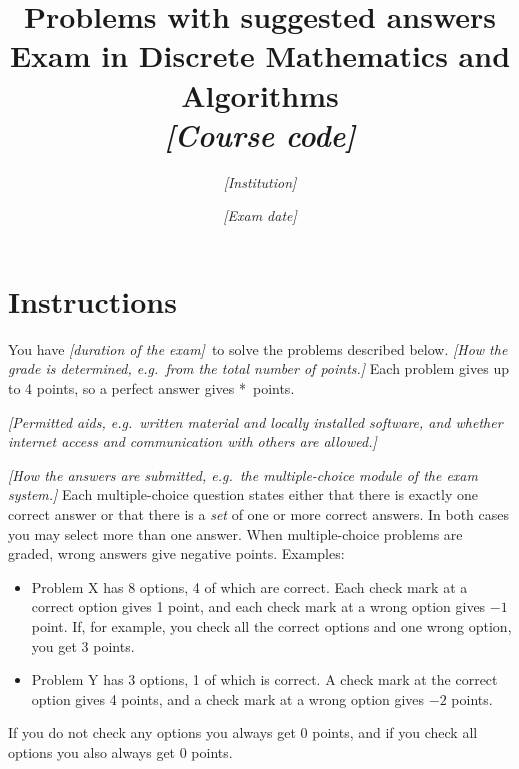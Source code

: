\documentclass[12pt]{article}
\newcommand{\placeholder}[1]{\textit{[#1]}}
\newcommand{\examdate}{\placeholder{Exam date}}
\newcommand{\examduration}{\placeholder{duration of the exam}}
\newcommand{\problemfile}{dma-problems-2026-april} %
\newcommand{\withanswers}{{\bf Problems with suggested answers}\\}
\newcommand{\withanswers}{}
\begin{document}
\title{\Large \withanswers Exam in Discrete Mathematics and Algorithms\\
{\small \placeholder{Course code}}}

\author{\placeholder{Institution}}
\date{\examdate}

\maketitle

\section*{Instructions}

You have \examduration\ to solve the  problems described below.
\placeholder{How the grade is determined, e.g.\ from the total number of points.}
Each problem gives up to 4 points, so a perfect answer gives \the{}*\relax\ points.

\medskip

\placeholder{Permitted aids, e.g.\ written material and locally installed software, and whether internet access and communication with others are allowed.}

\medskip

\placeholder{How the answers are submitted, e.g.\ the multiple-choice module of the exam system.}
Each multiple-choice question states either that there is exactly one correct answer or that there is a \emph{set} of one or more correct answers.
In both cases you may select more than one answer.
When multiple-choice problems are graded, wrong answers give negative points.
Examples:
\begin{itemize}
\item Problem X has 8 options, 4 of which are correct. Each check mark at a correct option gives 1 point, and each check mark at a wrong option gives $-1$ point. If, for example, you check all the correct options and one wrong option, you get 3 points.
\item Problem Y has 3 options, 1 of which is correct. A check mark at the correct option gives 4 points, and a check mark at a wrong option gives $-2$ points.
\end{itemize}
If you do not check any options you always get 0 points, and if you check all options you also always get 0 points.

\newpage


\end{document}
